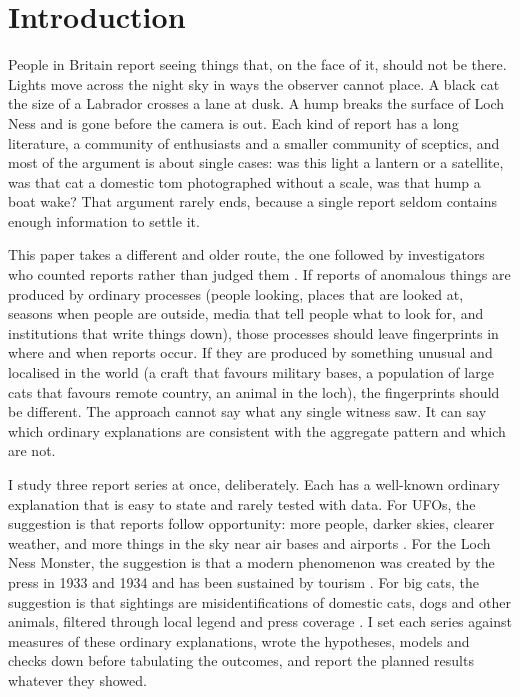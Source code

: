 \documentclass[11pt,a4paper]{article}
\begin{document}
\section{Introduction}\label{sec:intro}
People in Britain report seeing things that, on the face of it, should not be there. Lights move across the night sky in ways the observer cannot place. A black cat the size of a Labrador crosses a lane at dusk. A hump breaks the surface of Loch Ness and is gone before the camera is out. Each kind of report has a long literature, a community of enthusiasts and a smaller community of sceptics, and most of the argument is about single cases: was this light a lantern or a satellite, was that cat a domestic tom photographed without a scale, was that hump a boat wake? That argument rarely ends, because a single report seldom contains enough information to settle it.

This paper takes a different and older route, the one followed by investigators who counted reports rather than judged them \citep{hendry1979,paxton2009}. If reports of anomalous things are produced by ordinary processes (people looking, places that are looked at, seasons when people are outside, media that tell people what to look for, and institutions that write things down), those processes should leave fingerprints in where and when reports occur. If they are produced by something unusual and localised in the world (a craft that favours military bases, a population of large cats that favours remote country, an animal in the loch), the fingerprints should be different. The approach cannot say what any single witness saw. It can say which ordinary explanations are consistent with the aggregate pattern and which are not.

I study three report series at once, deliberately. Each has a well-known ordinary explanation that is easy to state and rarely tested with data. For UFOs, the suggestion is that reports follow opportunity: more people, darker skies, clearer weather, and more things in the sky near air bases and airports \citep{medina2023}. For the Loch Ness Monster, the suggestion is that a modern phenomenon was created by the press in 1933 and 1934 and has been sustained by tourism \citep{binns1983,loxton2013,naish2016}. For big cats, the suggestion is that sightings are misidentifications of domestic cats, dogs and other animals, filtered through local legend and press coverage \citep{clarke2014b}. I set each series against measures of these ordinary explanations, wrote the hypotheses, models and checks down before tabulating the outcomes, and report the planned results whatever they showed.
\end{document}

